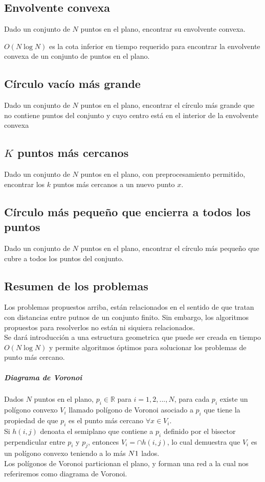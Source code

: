 \subsection{Envolvente convexa}
Dado un conjunto de $N$ puntos en el plano, encontrar su envolvente convexa.

\begin{theorem}
$O(N \log N)$ es la cota inferior en tiempo requerido para encontrar la envolvente convexa de un conjunto de puntos en el plano.
\end{theorem}

\subsection{Círculo vacío más grande}
Dado un conjunto de $N$ puntos en el plano, encontrar el círculo más grande que no contiene puntos del conjunto y cuyo centro está en el interior de la envolvente convexa

\subsection{$K$ puntos más cercanos}
Dado un conjunto de $N$ puntos en el plano, con preprocesamiento permitido, encontrar los $k$ puntos más cercanos a un nuevo punto $x$.

\subsection{Círculo más pequeño que encierra a todos los puntos}
Dado un conjunto de $N$ puntos en el plano, encontrar el círculo más pequeño que cubre a todos los puntos del conjunto.

\subsection{Resumen de los problemas}
Los problemas propuestos arriba, están relacionados en el sentido de que tratan con distancias entre putnos de un conjunto finito. Sin embargo, los algoritmos propuestos para resolverlos no están ni siquiera relacionados. \\
Se dará introducción a una estructura geometrica que puede ser creada en tiempo $O(N \log N)$ y permite algoritmos óptimos para solucionar los problemas de punto más cercano.


\subparagraph{Diagrama de Voronoi}
Dados $N$ puntos en el plano, $p_i \in \mathbb{R} $ para $i=1,2,...,N$, para cada $p_i$ existe un polígono convexo $V_i$ llamado polígono de Voronoi asociado a $p_i$ que tiene la propiedad de que $p_i$ es el punto más cercano $\forall x \in V_i$. \\
Si $h(i,j)$ denoata el semiplano que contiene a $p_i$ definido por el bisector perpendicular entre $p_i$ y $p_j$, entonces $V_i = \cap h(i,j)$, lo cual demuestra que $V_i$ es un polígono convexo teniendo a lo más $N\-1$ lados.\\
Los polígonos de Voronoi particionan el plano, y forman una red a la cual nos referiremos como diagrama de Voronoi.

